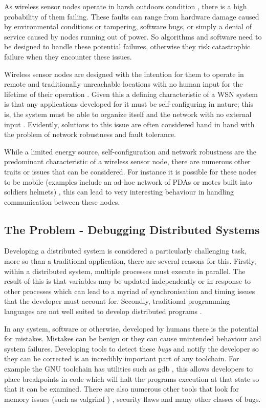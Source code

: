 As wireless sensor nodes operate in harsh outdoors condition \cite{SzewczykPMC04,Werner-Allen:2006:FYV:1298455.1298491}, there is a high probability of them failing. These faults can range from hardware damage caused by environmental conditions or tampering, software bugs, or simply a denial of service caused by nodes running out of power. So algorithms and software need to be designed to handle these potential failures, otherwise they risk catastrophic failure when they encounter these issues.

Wireless sensor nodes are designed with the intention for them to operate in remote and traditionally unreachable locations with no human input for the lifetime of their operation \cite{1437066}. Given this a defining characteristic of a WSN system is that any applications developed for it must be self-configuring in nature; this is, the system must be able to organize itself and the network with no external input \cite{1368897}. Evidently, solutions to this issue are often considered hand in hand with the problem of network robustness and fault tolerance.   

While a limited energy source, self-configuration and network robustness are the predominant characteristic of a wireless sensor node, there are numerous other traits or issues that can be considered. For instance it is possible for these nodes to be mobile (examples include an ad-hoc network of PDAs or motes built into soldiers helmets) \cite{4224091}, this can lead to very interesting behaviour in handling communication between these nodes.

\subsection{The Problem - Debugging Distributed Systems}

Developing a distributed system is considered a particularly challenging task, more so than a traditional application, there are several reasons for this. Firstly, within a distributed system, multiple processes must execute in parallel. The result of this is that variables may be updated independently or in response to other processes which can lead to a myriad of synchronisation and timing issues that the developer must account for. Secondly, traditional programming languages are not well suited to develop distributed programs \cite{93692,345831}.

In any system, software or otherwise, developed by humans there is the potential for mistakes. Mistakes can be benign or they can cause unintended behaviour and system failures. Developing tools to detect these \emph{bugs} and notify the developer so they can be corrected is an incredibly important part of any toolchain. For example the GNU toolchain has utilities such as gdb \cite{stallman1992gdb}, this allows developers to place breakpoints in code which will halt the programs execution at that state so that it can be examined. There are also numerous other tools that look for memory issues (such as valgrind \cite{seward2004valgrind}) \cite{Bond:2007:TBA:1297105.1297057,Nethercote:2007:SBM:1254810.1254820}, security flaws \cite{898880,976940} and many other classes of bugs.

